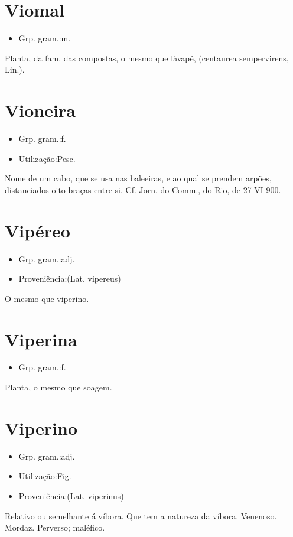 \documentclass{article}
\begin{document}
\section{Viomal}
\begin{itemize}
\item {Grp. gram.:m.}
\end{itemize}
Planta, da fam. das compostas, o mesmo que \textunderscore làvapé\textunderscore , (\textunderscore centaurea sempervirens\textunderscore , Lin.).
\section{Vioneira}
\begin{itemize}
\item {Grp. gram.:f.}
\end{itemize}
\begin{itemize}
\item {Utilização:Pesc.}
\end{itemize}
Nome de um cabo, que se usa nas baleeiras, e ao qual se prendem arpões, distanciados oito braças entre si. Cf. \textunderscore Jorn.-do-Comm.\textunderscore , do Rio, de 27-VI-900.
\section{Vipéreo}
\begin{itemize}
\item {Grp. gram.:adj.}
\end{itemize}
\begin{itemize}
\item {Proveniência:(Lat. \textunderscore vipereus\textunderscore )}
\end{itemize}
O mesmo que \textunderscore viperino\textunderscore .
\section{Viperina}
\begin{itemize}
\item {Grp. gram.:f.}
\end{itemize}
Planta, o mesmo que \textunderscore soagem\textunderscore .
\section{Viperino}
\begin{itemize}
\item {Grp. gram.:adj.}
\end{itemize}
\begin{itemize}
\item {Utilização:Fig.}
\end{itemize}
\begin{itemize}
\item {Proveniência:(Lat. \textunderscore viperinus\textunderscore )}
\end{itemize}
Relativo ou semelhante á víbora.
Que tem a natureza da víbora.
Venenoso.
Mordaz.
Perverso; maléfico.
\end{document}
